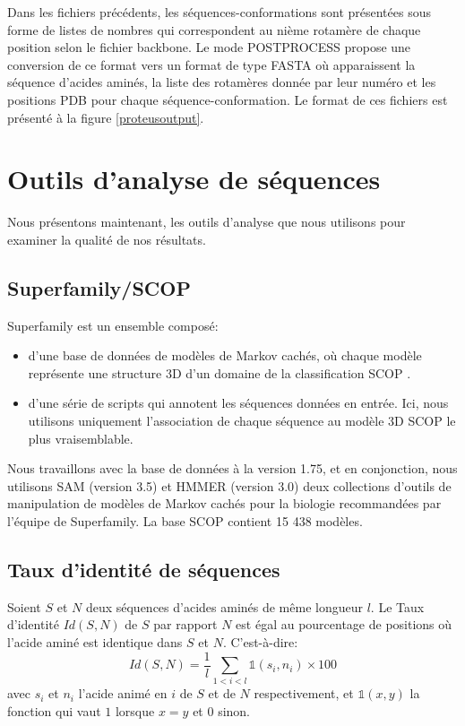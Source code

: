 Dans les fichiers précédents, les séquences-conformations sont présentées sous forme de listes de nombres qui correspondent au nième rotamère de chaque position selon le fichier backbone. Le mode POSTPROCESS propose une conversion de ce format vers un format de type FASTA où apparaissent la séquence d'acides aminés, la liste des rotamères donnée par leur numéro et les positions PDB pour chaque séquence-conformation. Le format de ces fichiers est présenté à la figure \ref{proteusoutput}.

\section{Outils d'analyse de séquences}

Nous présentons maintenant, les outils d'analyse que nous utilisons pour examiner la qualité de nos résultats.
\subsection{Superfamily/SCOP}
\label{sec:Superfamily}
Superfamily \cite{Madera04} est un ensemble composé: 
\begin{itemize}
\item d'une base de données de modèles de Markov cachés, où chaque modèle représente une structure 3D d'un domaine de la classification SCOP \cite{Andreeva04}.
\item d'une série de scripts qui annotent les séquences données en entrée. Ici, nous utilisons uniquement l'association de chaque séquence au modèle 3D SCOP le plus vraisemblable. 
\end{itemize}
Nous travaillons avec la base de données à la version 1.75, et en conjonction, nous utilisons SAM (version 3.5) \cite{hughey95} et HMMER (version 3.0) \cite{HMMER} deux collections d'outils de manipulation de modèles de Markov cachés pour la biologie recommandées par l'équipe de Superfamily. La base SCOP contient 15 438 modèles.

\subsection{Taux d'identité de séquences}

Soient $S$ et $N$ deux séquences d'acides aminés de même longueur $l$. Le Taux d'identité $Id(S,N)$ de $S$ par rapport $N$ est égal au pourcentage de positions où l'acide aminé est identique dans $S$ et $N$. C'est-à-dire:
\begin{equation}
Id(S,N) =\frac{1}{l}\sum_{1<i<l} \mathds{1}(s_i,n_i) \times 100
\end{equation}
avec $s_i$ et $n_i$ l'acide animé en $i$ de $S$ et de $N$ respectivement, et $\mathds{1}(x,y)$ la fonction qui vaut $1$ lorsque $x=y$ et $0$ sinon. 
